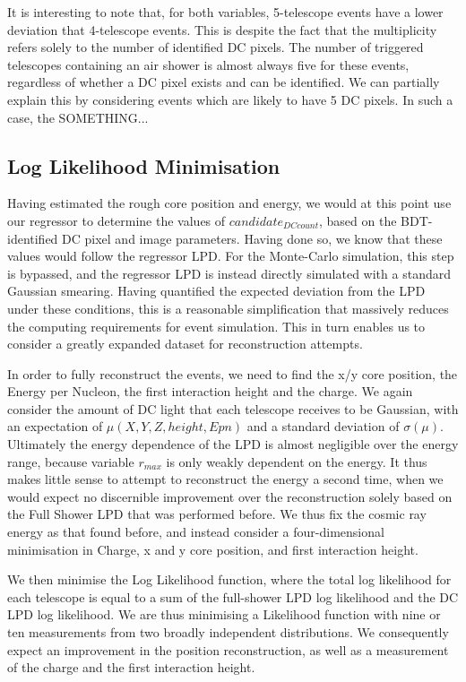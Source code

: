 \documentclass[11pt]{article}
\begin{document}
It is interesting to note that, for both variables, 5-telescope events have a lower deviation that 4-telescope events. This is despite the fact that the multiplicity refers solely to the number of identified DC pixels. The number of triggered telescopes containing an air shower is almost always five for these events, regardless of whether a DC pixel exists and can be identified. We can partially explain this by considering events which are likely to have 5 DC pixels. In such a case, the SOMETHING...

\subsection{Log Likelihood Minimisation}
Having estimated the rough core position and energy, we would at this point use our regressor to determine the values of $candidate_{DCcount}$, based on the BDT-identified DC pixel and image parameters. Having done so, we know that these values would follow the regressor LPD. For the Monte-Carlo simulation, this step is bypassed, and the regressor LPD is instead directly simulated with a standard Gaussian smearing. Having quantified the expected deviation from the LPD under these conditions, this is a reasonable simplification that massively reduces the computing requirements for event simulation. This in turn enables us to consider a greatly expanded dataset for reconstruction attempts.
 
In order to fully reconstruct the events, we need to find the x/y core position, the Energy per Nucleon, the first interaction height and the charge. We again consider the amount of DC light that each telescope receives to be Gaussian, with an expectation of $\mu(X, Y, Z, height, Epn)$ and a standard deviation of $\sigma(\mu)$. Ultimately the energy dependence of the LPD is almost negligible over the energy range, because variable $r_{max}$ is only weakly dependent on the energy. It thus makes little sense to attempt to reconstruct the energy a second time, when we would expect no discernible improvement over the reconstruction solely based on the Full Shower LPD that was performed before. We thus fix the cosmic ray energy as that found before, and instead consider a four-dimensional minimisation in Charge, x and y core position, and first interaction height.

We then minimise the Log Likelihood function, where the total log likelihood for each telescope is equal to a sum of the full-shower LPD log likelihood and the DC LPD log likelihood. We are thus minimising a Likelihood function with nine or ten measurements from two broadly independent distributions. We consequently expect an improvement in the position reconstruction, as well as a measurement of the charge and the first interaction height.
\end{document}
